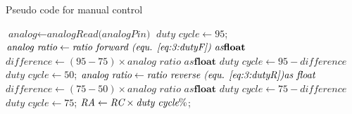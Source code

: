 \begin{algorithm}
	\caption{Pseudo code for manual control}
	\label{alg:3:manualControl}
	\begin{algorithmic}[1]
		\State $\textit{analog} \gets \textit{analogRead(analogPin)}$
		\State $\textit{duty cycle} \gets 95$;
		\State $\textit{analog ratio} \gets \textit{ratio forward (equ. \ref{eq:3:dutyF}) as} \textbf{float} $
		\State $\textit{difference} \gets (95 - 75) \times \textit{analog ratio as} \textbf{float}$
		\State $\textit{duty cycle} \gets 95 - \textit{difference} $
		\State $\textit{duty cycle} \gets 50$;
		\State $\textit{analog ratio} \gets \textit{ratio reverse (equ. \ref{eq:3:dutyR})} \textit{as float} $
		\State $\textit{difference} \gets (75 - 50) \times \textit{analog ratio as} \textbf{float}$
		\State $\textit{duty cycle} \gets 75 - \textit{difference}$
		\Else 
		\State $\textit{duty cycle} \gets 75$;
		\EndIf
		\EndProcedure
		\State $\textit{RA} \gets \textit{RC} \times \textit{duty cycle\SI{}{\percent}}$;
		\EndProcedure
	\end{algorithmic}
\end{algorithm}
